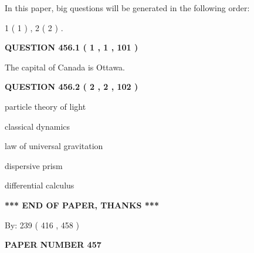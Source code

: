 \documentclass[12pt]{article}
\begin{document}
   
   
\vspace{0.2in}
   
In this paper, big questions will be generated in the following order: 
   
   
   1 ( 1 )
 ,
   2 ( 2 )
 .
  
\vspace{0.2in}
  
{\textbf{\Large{QUESTION
456.1 
 ( 1 , 1 , 101 )
}}}
  
  
 
 
\noindent{}
 
 
The capital of Canada is Ottawa.
 
 
 
 
  
\vspace{0.2in}
  
{\textbf{\Large{QUESTION
456.2 
 ( 2 , 2 , 102 )
}}}
  
  
 
 
\noindent{}
 
 
particle theory of light
 
 
classical dynamics
 
 
law of universal gravitation
 
 
dispersive prism
 
 
differential calculus
 
 
 
 
   
   
\vspace{1.0in} 
{\textbf{\large{ *** END OF PAPER, THANKS *** }}} 
   
   
\hspace{1.0in} By: 
 239 ( 416 ,  458 )
   
   
   
   
\newpage 
\setcounter{page}{ 
   457001 } 
   
   
   
   
 {\textbf{ \Large{ PAPER NUMBER  457  }}}
   
   
\vspace{0.2in}
   
\end{document}

